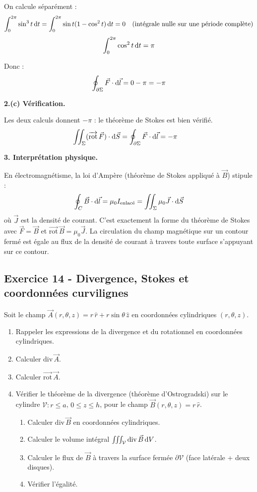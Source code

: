 \documentclass[12pt,a4paper]{article}
\begin{document}
\begin{boitecorrige}
On calcule séparément :
\[
\int_0^{2\pi}\sin^3 t\,\mathrm{d} t = \int_0^{2\pi}\sin t(1-\cos^2 t)\,\mathrm{d} t = 0 \quad (\text{intégrale nulle sur une période complète})
\]
\[
\int_0^{2\pi}\cos^2 t\,\mathrm{d} t = \pi
\]

Donc :
\[
\oint_{\partial\Sigma} \vec{F}\cdot\mathrm{d}\vec{l} = 0 - \pi = -\pi
\]

\textbf{2.(c) Vérification.}

Les deux calculs donnent $-\pi$ : le théorème de Stokes est bien vérifié.
\[
\iint_\Sigma (\overrightarrow{\text{rot}}\,\vec{F})\cdot\mathrm{d}\vec{S} = \oint_{\partial\Sigma} \vec{F}\cdot\mathrm{d}\vec{l} = -\pi \quad
\]

\textbf{3. Interprétation physique.}

En électromagnétisme, la loi d'Ampère (théorème de Stokes appliqué à $\vec{B}$) stipule :
\[
\oint_C \vec{B}\cdot\mathrm{d}\vec{l} = \mu_0 I_{\text{enlacé}} = \iint_\Sigma \mu_0\vec{J}\cdot\mathrm{d}\vec{S}
\]
où $\vec{J}$ est la densité de courant. C'est exactement la forme du théorème de Stokes avec $\vec{F} = \vec{B}$ et $\overrightarrow{\text{rot}}\,\vec{B} = \mu_0\vec{J}$. La circulation du champ magnétique sur un contour fermé est égale au flux de la densité de courant à travers toute surface s'appuyant sur ce contour.
\end{boitecorrige}

\subsection*{Exercice 14 - Divergence, Stokes et coordonnées curvilignes \niveau{\difficile}}

\begin{boiteexercice}
Soit le champ $\vec{A}(r,\theta,z) = r\,\hat{r} + r\sin\theta\,\hat{z}$ en coordonnées cylindriques $(r,\theta,z)$.

\begin{enumerate}
  \item Rappeler les expressions de la divergence et du rotationnel en coordonnées cylindriques.
  \item Calculer $\text{div}\,\vec{A}$.
  \item Calculer $\overrightarrow{\text{rot}}\,\vec{A}$.
  \item Vérifier le théorème de la divergence (théorème d'Ostrogradski) sur le cylindre $\mathcal{V} : r \leq a$, $0 \leq z \leq h$, pour le champ $\vec{B}(r,\theta,z) = r\,\hat{r}$.
  \begin{enumerate}[label=(\alph*)]
    \item Calculer $\text{div}\,\vec{B}$ en coordonnées cylindriques.
    \item Calculer le volume intégral $\iiint_\mathcal{V} \text{div}\,\vec{B}\,\mathrm{d} V$.
    \item Calculer le flux de $\vec{B}$ à travers la surface fermée $\partial\mathcal{V}$ (face latérale + deux disques).
    \item Vérifier l'égalité.
  \end{enumerate}
\end{enumerate}
\end{boiteexercice}
\end{document}
